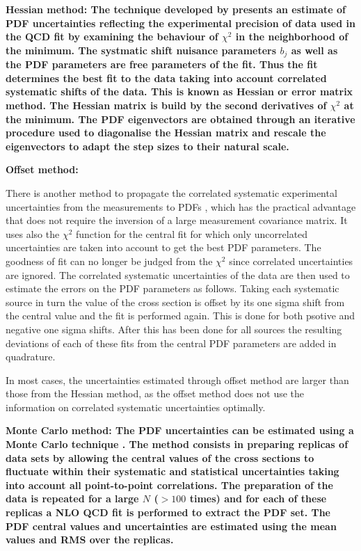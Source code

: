 \begin{description}
\item \bf{Hessian method:} \rm
The technique developed by \cite{Pumplin:2001ct} presents an estimate of PDF uncertainties reflecting the experimental precision of data used in the QCD fit by examining the behaviour of $\chi^2$ in the neighborhood of the minimum. The systmatic shift nuisance parameters $b_j$ as well as the PDF parameters are free parameters of the fit. Thus the fit determines the best fit to the data taking into account correlated systematic shifts of the data. This is known as Hessian or error matrix method. The Hessian matrix is build by the second derivatives of $\chi^2$ at the minimum. The PDF eigenvectors are obtained through an iterative procedure used to diagonalise the Hessian matrix and rescale the eigenvectors to adapt the step sizes to their natural scale.

\item \bf{Offset  method:} \rm

There is another method to propagate the correlated systematic experimental uncertainties from the measurements to PDFs \cite{Botje:2001fx}, which has the practical advantage that does not require the inversion of a large measurement covariance matrix.
%
It uses also the $\chi^2$ function for the central fit for which only
uncorrelated uncertainties are taken into account to get the best PDF parameters. The goodness of fit can no longer be judged from the $\chi^2$ since correlated uncertainties are ignored. 
%
The correlated systematic uncertainties of the data are then used to estimate 
the errors on the PDF parameters as follows.
Taking each systematic source in turn the value of the cross section is offset 
by its one sigma shift from the central value and the fit is performed again.
This is done for both psotive and negative one sigma shifts. 
After this has been done for all sources the 
resulting deviations of each of these fits from the central PDF parameters are added in quadrature. 

In most cases, the uncertainties estimated through offset method are larger than those from the Hessian method, as the offset method does not use the information on correlated systematic uncertainties optimally.

\item \bf{Monte Carlo method:} \rm
The PDF uncertainties can be estimated using a Monte Carlo technique \cite{Giele:1998gw, mcmethod2}.
The method consists in preparing replicas of data sets by allowing the central values of the cross sections to 
fluctuate within their systematic and statistical uncertainties taking into account all point-to-point correlations.
The preparation of the data is repeated for a large $N$ ($>100$ times) and for each of these replicas a NLO QCD fit is performed to 
extract the PDF set. The PDF central values and uncertainties are estimated using the mean values and RMS 
over the replicas. 
\end{description}


